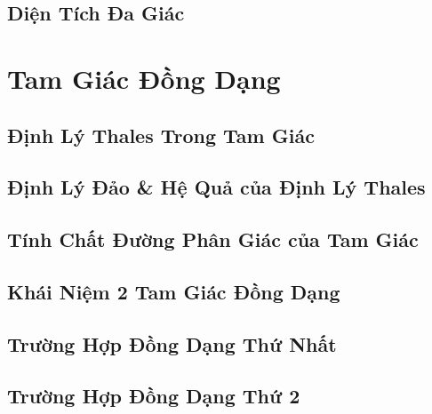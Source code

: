 \documentclass{article}
\numberwithin{equation}{section}
\begin{document}
\subsection{Diện Tích Đa Giác}


\section{Tam Giác Đồng Dạng}

\subsection{Định Lý Thales Trong Tam Giác}


\subsection{Định Lý Đảo \& Hệ Quả của Định Lý Thales}


\subsection{Tính Chất Đường Phân Giác của Tam Giác}


\subsection{Khái Niệm 2 Tam Giác Đồng Dạng}


\subsection{Trường Hợp Đồng Dạng Thứ Nhất}


\subsection{Trường Hợp Đồng Dạng Thứ 2}
\end{document}
